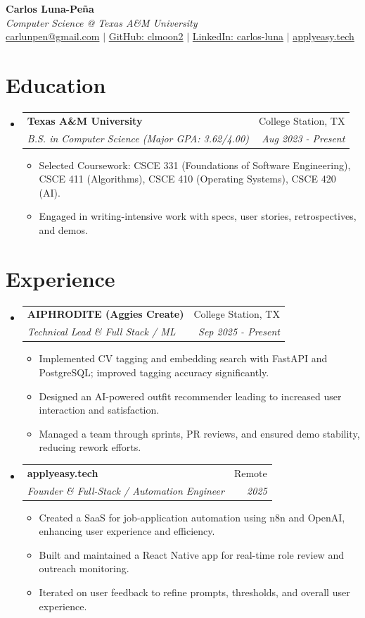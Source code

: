 \documentclass[letterpaper,11pt]{article}
\makeatletter
\newcommand{\resumeItem}[1]{
  \item\small{{#1 \vspace{-2pt}}}
}
\newcommand{\resumeSubheading}[4]{
  \vspace{-2pt}\item
  \begin{tabular*}{0.97\textwidth}[t]{l@{\extracolsep{\fill}}r}
    \textbf{#1} & #2 \\
    \textit{\small#3} & \textit{\small #4} \\
  \end{tabular*}\vspace{-7pt}
}
\newcommand{\resumeSubHeadingListStart}{\begin{itemize}[leftmargin=0.15in, label={}]}
\newcommand{\resumeSubHeadingListEnd}{\end{itemize}}
\newcommand{\resumeItemListStart}{\begin{itemize}}
\newcommand{\resumeItemListEnd}{\end{itemize}\vspace{-5pt}}
\makeatother
\begin{document}
\begin{center}
  \textbf{\Huge Carlos Luna-Peña} \\
  \vspace{5pt}
  \textit{Computer Science @ Texas A\&M University} \\
  \vspace{5pt}
  \href{mailto:carlunpen@gmail.com}{carlunpen@gmail.com} $|$ 
  \href{https://github.com/clmoon2}{GitHub: clmoon2} $|$ 
  \href{https://linkedin.com/in/carlos-luna}{LinkedIn: carlos-luna} $|$
  \href{https://applyeasy.tech}{applyeasy.tech} \\
\end{center}

\section{Education}
\resumeSubHeadingListStart
\resumeSubheading
{Texas A\&M University}{College Station, TX}
{B.S. in Computer Science (Major GPA: 3.62/4.00)}{Aug 2023 - Present}
\resumeItemListStart
\resumeItem{Selected Coursework: CSCE 331 (Foundations of Software Engineering), CSCE 411 (Algorithms), CSCE 410 (Operating Systems), CSCE 420 (AI).}
\resumeItem{Engaged in writing-intensive work with specs, user stories, retrospectives, and demos.}
\resumeItemListEnd
\resumeSubHeadingListEnd

\section{Experience}
\resumeSubHeadingListStart
\resumeSubheading
{AIPHRODITE (Aggies Create)}{College Station, TX}
{Technical Lead \& Full Stack / ML}{Sep 2025 - Present}
\resumeItemListStart
\resumeItem{Implemented CV tagging and embedding search with FastAPI and PostgreSQL; improved tagging accuracy significantly.}
\resumeItem{Designed an AI-powered outfit recommender leading to increased user interaction and satisfaction.}
\resumeItem{Managed a team through sprints, PR reviews, and ensured demo stability, reducing rework efforts.}
\resumeItemListEnd

\resumeSubheading
{applyeasy.tech}{Remote}
{Founder \& Full-Stack / Automation Engineer}{2025}
\resumeItemListStart
\resumeItem{Created a SaaS for job-application automation using n8n and OpenAI, enhancing user experience and efficiency.}
\resumeItem{Built and maintained a React Native app for real-time role review and outreach monitoring.}
\resumeItem{Iterated on user feedback to refine prompts, thresholds, and overall user experience.}
\resumeItemListEnd
\resumeSubHeadingListEnd
\end{document}
